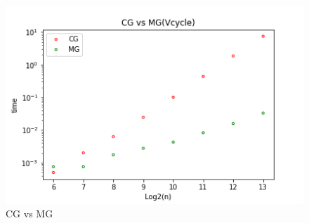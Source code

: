 \documentclass{article}
\begin{document}
\begin{figure}[htbp]
    \centering
    \includegraphics[width=.8\textwidth]{cg_mg.png}
    \caption{CG vs MG}\label{fig:demo1}
\end{figure}
\end{document}
